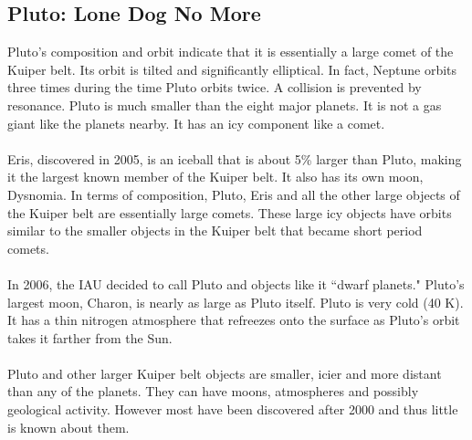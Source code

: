 \documentclass[12pt]{article}
\begin{document}
\subsection{Pluto: Lone Dog No More}
Pluto's composition and orbit indicate that it is essentially a large comet of the Kuiper belt. Its orbit is tilted and significantly elliptical. In fact, Neptune orbits three times during the time Pluto orbits twice. A collision is prevented by resonance. Pluto is much smaller than the eight major planets. It is not a gas giant like the planets nearby. It has an icy component like a comet. \\~\\ 
Eris, discovered in 2005, is an iceball that is about 5\% larger than Pluto, making it the largest known member of the Kuiper belt. It also has its own moon, Dysnomia. In terms of composition, Pluto, Eris and all the other large objects of the Kuiper belt are essentially large comets. These large icy objects have orbits similar to the smaller objects in the Kuiper belt that became short period comets. \\~\\
In 2006, the IAU decided to call Pluto and objects like it ``dwarf planets." Pluto's largest moon, Charon, is nearly as large as Pluto itself. Pluto is very cold (40 K). It has a thin nitrogen atmosphere that refreezes onto the surface as Pluto's orbit takes it farther from the Sun. \\~\\
Pluto and other larger Kuiper belt objects are smaller, icier and more distant than any of the planets. They can have moons, atmospheres and possibly geological activity. However most have been discovered after 2000 and thus little is known about them. 
\end{document}
